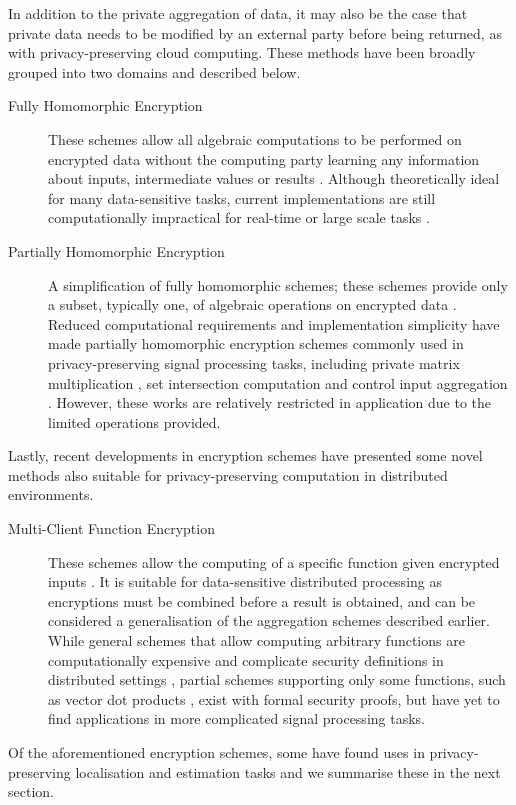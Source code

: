 \documentclass[twocolumn]{autart}
\begin{document}
In addition to the private aggregation of data, it may also be the case that private data needs to be modified by an external party before being returned, as with privacy-preserving cloud computing. These methods have been broadly grouped into two domains and described below.
\begin{description}
    \item[Fully Homomorphic Encryption] These schemes allow all algebraic computations to be performed on encrypted data without the computing party learning any information about inputs, intermediate values or results \cite{gentryFullyHomomorphicEncryption2009,stehleFasterFullyHomomorphic2010}. Although theoretically ideal for many data-sensitive tasks, current implementations are still computationally impractical for real-time or large scale tasks \cite{acarSurveyHomomorphicEncryption2018}.
    \item[Partially Homomorphic Encryption] A simplification of fully homomorphic schemes; these schemes provide only a subset, typically one, of algebraic operations on encrypted data \cite{elgamalPublicKeyCryptosystem1985,paillierPublicKeyCryptosystemsBased1999,bonehEvaluating2DNFFormulas2005}. Reduced computational requirements and implementation simplicity have made partially homomorphic encryption schemes commonly used in privacy-preserving signal processing tasks, including private matrix multiplication \cite{kogisoCyberSecurityEnhancementNetworked2015}, set intersection computation \cite{kerschbaumOutsourcedPrivateSet2012} and control input aggregation \cite{alexandruEncryptedCooperativeControl2019}. However, these works are relatively restricted in application due to the limited operations provided.
\end{description}
Lastly, recent developments in encryption schemes have presented some novel methods also suitable for privacy-preserving computation in distributed environments.
\begin{description}
    \item[Multi-Client Function Encryption] These schemes allow the computing of a specific function given encrypted inputs \cite{bonehFunctionalEncryptionDefinitions2011,goldwasserMultiinputFunctionalEncryption2014}. It is suitable for data-sensitive distributed processing as encryptions must be combined before a result is obtained, and can be considered a generalisation of the aggregation schemes described earlier. While general schemes that allow computing arbitrary functions are computationally expensive and complicate security definitions in distributed settings \cite{agrawalFunctionalEncryptionNew2013}, partial schemes supporting only some functions, such as vector dot products \cite{chotardDecentralizedMultiClientFunctional2018}, exist with formal security proofs, but have yet to find applications in more complicated signal processing tasks.
\end{description}
Of the aforementioned encryption schemes, some have found uses in privacy-preserving localisation and estimation tasks and we summarise these in the next section.
\end{document}
